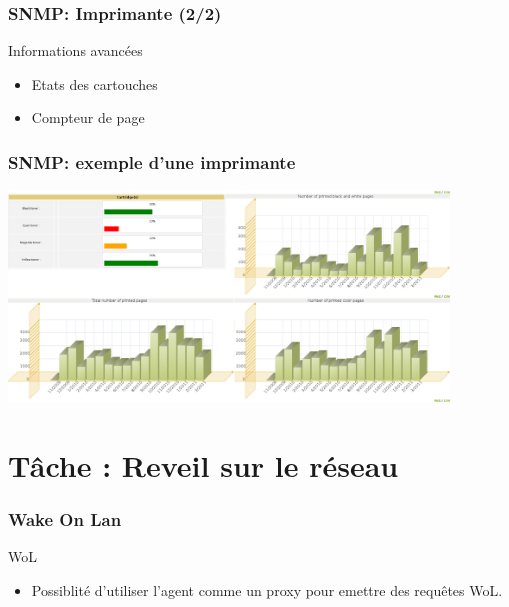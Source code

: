 \documentclass{beamer}
\begin{document}
\begin{frame}
    \frametitle{SNMP: Imprimante (2/2)}

    \begin{block}{Informations avancées}
    \begin{itemize}
    \item Etats des cartouches
    \item Compteur de page
    \end{itemize}
    \end{block}
\end{frame}

\begin{frame}
    \frametitle{SNMP: exemple d'une imprimante}

    \begin{center}
    \includegraphics[width=11.7cm]{./pics/printer_graph.png}
    \end{center}
\end{frame}

\section{Tâche : Reveil sur le réseau}

\begin{frame}
    \frametitle{Wake On Lan}

    \begin{block}{WoL}
    \begin{itemize}
        \item Possiblité d'utiliser l'agent comme un proxy pour emettre des requêtes WoL.
    \end{itemize}
    \end{block}

\end{frame}
\end{document}
